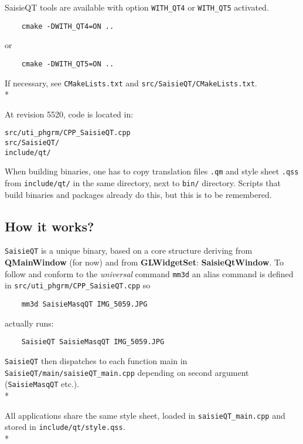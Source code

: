 SaisieQT tools are available with option {\tt WITH\_QT4} or {\tt WITH\_QT5} activated.

\begin{verbatim}
    cmake -DWITH_QT4=ON ..
\end{verbatim}
 or
\begin{verbatim}
    cmake -DWITH_QT5=ON ..
\end{verbatim}

If necessary, see {\tt CMakeLists.txt} and {\tt src/SaisieQT/CMakeLists.txt}.\\*

At revision 5520, code is located in:
\begin{verbatim}
src/uti_phgrm/CPP_SaisieQT.cpp
src/SaisieQT/
include/qt/
\end{verbatim}

When building binaries, one has to copy translation files {\tt .qm} and style sheet {\tt .qss} from {\tt include/qt/} in the same directory, next to {\tt bin/} directory. Scripts that build binaries and packages already do this, but this is to be remembered.

\subsection{How it works?}

{\tt SaisieQT} is a unique binary, based on a core structure deriving from \textbf{QMainWindow} (for now) and from \textbf{GLWidgetSet}: \textbf{SaisieQtWindow}. To follow and conform to the \textit{universal} command {\tt mm3d} an alias command is defined in {\tt src/uti\_phgrm/CPP\_SaisieQT.cpp} so 

\begin{verbatim}
	mm3d SaisieMasqQT IMG_5059.JPG
\end{verbatim}

actually runs:

\begin{verbatim}
	SaisieQT SaisieMasqQT IMG_5059.JPG
\end{verbatim}

{\tt SaisieQT} then dispatches to each function main in {\tt SaisieQT/main/saisieQT\_main.cpp}  depending on second argument ({\tt SaisieMasqQT} etc.).\\*

All applications share the same style sheet, loaded in {\tt saisieQT\_main.cpp} and stored in {\tt include/qt/style.qss}.\\*

